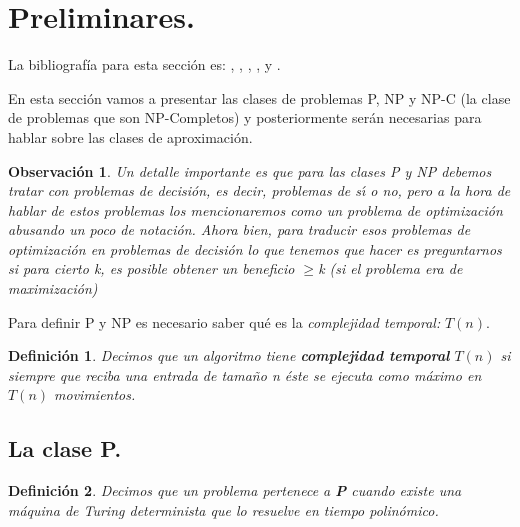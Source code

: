 \documentclass[a4paper,12pt,titlepage]{article}
\newtheorem{defi}{Definici\'on}[section]
\newtheorem{obs}{Observaci\'on}[section]
\begin{document}
\newpage

\section{Preliminares.}
\label{sec:preliminares}

La bibliograf\'ia para esta secci\'on es: \cite{aks_complexity}, \cite{quicksort}, \cite{BFS}, \cite{AroraBarak}, \cite{HopcroftESP} y \cite{approx_core}.

\vspace{0.3cm}

En esta secci\'on vamos a presentar las clases de problemas P, NP y NP-C (la clase de problemas que son NP-Completos)
y posteriormente ser\'an necesarias para hablar sobre las clases de aproximaci\'on.

\begin{obs}

Un detalle importante es que para las clases P y NP debemos tratar con problemas de decisi\'on, es decir, problemas de s{\'\i} o no, pero a la hora de hablar de estos problemas los mencionaremos como un problema de optimizaci\'on abusando un poco de notaci\'on. Ahora bien, para traducir esos problemas de optimizaci\'on en problemas de decisi\'on lo que tenemos que hacer es preguntarnos si para cierto k, es posible obtener un beneficio $\geq$k (si el problema era de maximizaci\'on)

\end{obs}

Para definir P y NP es necesario saber qu\'e es la \textsl{complejidad temporal:} $T(n)$.

\begin{defi}

Decimos que un algoritmo tiene \textbf{complejidad temporal}
$T(n)$ si siempre que reciba una entrada de tamaño n \'este se
ejecuta como m\'aximo en $T(n)$ movimientos.

\end{defi}

\subsection{La clase P.}

\begin{defi}

Decimos que un problema pertenece a \textbf{P} cuando existe una m\'aquina de Turing determinista que lo resuelve en tiempo polin\'omico.

\end{defi}
\end{document}
